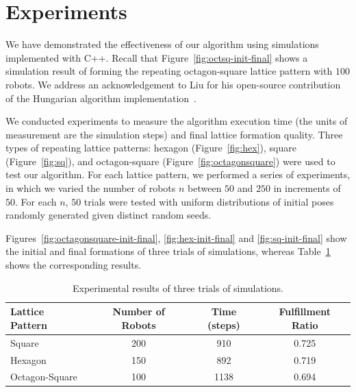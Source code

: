 \section{Experiments}
\label{sec:mrf-exp}
We have demonstrated the effectiveness of our algorithm using simulations implemented with C++. 
%
Recall that Figure~\ref{fig:octsq-init-final} shows a simulation result of forming the repeating octagon-square lattice pattern with $100$ robots.
%
We address an acknowledgement to Liu for his open-source contribution of the Hungarian algorithm implementation~\cite{LiuShe11, LiuShe12a}.


We conducted experiments to measure the algorithm execution time (the units of measurement are the simulation steps) and final lattice formation quality. 
%
Three types of repeating lattice patterns: hexagon (Figure~\ref{fig:hex}), square (Figure~\ref{fig:sq}), and octagon-square (Figure~\ref{fig:octagonsquare}) were used to test our algorithm.
%
For each lattice pattern, we performed a series of experiments, in which we varied the number of robots $n$ between $50$ and $250$ in increments of $50$.  
%
For each $n$, $50$ trials were tested with uniform distributions of initial poses randomly generated given distinct random seeds.

Figures~\ref{fig:octagonsquare-init-final}, \ref{fig:hex-init-final} and \ref{fig:sq-init-final} show the initial and final formations of three trials of simulations, whereas Table~\ref{tab:mrf1-exp-data} shows the corresponding results.
%

\begin{table}
  \small\centering
  \caption{Experimental results of three trials of simulations.}
    \begin{tabular}{lccc} 
    \toprule 
    \textbf{Lattice Pattern} & \textbf{Number of Robots} & \textbf{Time (steps)} & \textbf{Fulfillment Ratio} \\
    \midrule
    Square & 200 & 910 & 0.725  \\ 
    \midrule
    Hexagon & 150 & 892 & 0.719 \\
    \midrule
    Octagon-Square & 100 & 1138 & 0.694 \\
    \bottomrule     
    \end{tabular}
    \label{tab:mrf1-exp-data}
\end{table}

